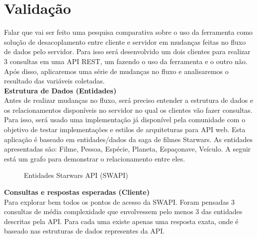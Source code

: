\section{Validação}

Falar que vai ser feito uma pesquisa comparativa sobre o uso da ferramenta como solução de desacoplamento entre cliente e servidor em mudanças feitas no fluxo de dados pelo servidor. Para isso será desenvolvido um dois clientes para realizar 3 consultas em uma API REST, um fazendo o uso da ferramenta e o outro não. Após disso, aplicaremos uma série de mudanças no fluxo e analisaremos o resultado das variáveis coletadas. \\

\textbf{Estrutura de Dados (Entidades)} \\

Antes de realizar mudanças no fluxo, será preciso entender a estrutura de dados e os relacionamentos disponíveis no servidor no qual os clientes vão fazer consultas. Para isso, será usado uma implementação já disponível pela comunidade com o objetivo de testar implementações e estilos de arquiteturas para API web. Esta aplicação é baseado em entidades/dados da saga de filmes Starwars. As entidades apresentadas são: Filme, Pessoa, Espécie, Planeta, Espaçonave, Veículo. A seguir está um grafo para demonstrar o relacionamento entre eles.

\begin{figure}[H]
  \centering
  \caption{Entidades Starwars API (SWAPI)}
\end{figure}

\textbf{Consultas e respostas esperadas (Cliente)} \\

Para explorar bem todos os pontos de acesso da SWAPI. Foram pensadas 3 consultas de média complexidade que envolvessem pelo menos 3 das entidades descritas pela API. Para cada uma existe apenas uma resposta exata, onde é baseado nas estruturas de dados representes da API.

